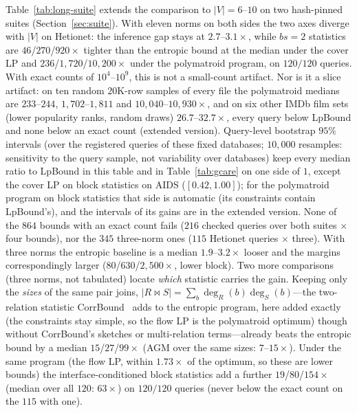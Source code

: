\documentclass[sigconf, nonacm, acmthm=false]{acmart}
\begin{document}
Table~\ref{tab:long-suite} extends the comparison to $|V|{=}6$--$10$ on two hash-pinned suites (Section~\ref{sec:suite}). With eleven norms on both sides the two axes
diverge with $|V|$ on Hetionet: the inference gap stays at
$2.7$--$3.1\times$, while $bs{=}2$ statistics are $46$/$270$/$920\times$
tighter than the entropic bound at the median under the cover LP and
$236$/$1{,}720$/$10{,}200\times$ under the polymatroid program, on
$120/120$ queries.
With exact counts of $10^{4}$--$10^{9}$, this is not a small-count artifact. Nor is it a slice artifact: on ten random $20$K-row samples of every file the polymatroid medians are $233$--$244$, $1{,}702$--$1{,}811$ and $10{,}040$--$10{,}930\times$, and on six other IMDb film sets (lower popularity ranks, random draws) $26.7$--$32.7\times$, every query below LpBound and none below an exact count (extended version). Query-level bootstrap $95\%$ intervals (over the registered queries of these fixed databases; $10{,}000$
resamples: sensitivity to the query sample, not variability over databases) keep every median ratio to LpBound in this table and in
Table~\ref{tab:gcare} on one side of $1$, except the cover LP on block
statistics on AIDS ($[0.42, 1.00]$); for the polymatroid program on block statistics that side is automatic (its constraints contain LpBound's), and the intervals of its gains are in the extended version. None of the $864$ bounds with an exact count
fails ($216$ checked queries over both suites ${\times}$ four bounds), nor
the $345$ three-norm ones ($115$ Hetionet queries ${\times}$ three). With
three norms the entropic baseline is a median $1.9$--$3.2\times$ looser
and the margins correspondingly larger ($80$/$630$/$2{,}500\times$, lower
block). Two more comparisons (three norms, not tabulated) locate \emph{which} statistic
carries the gain. Keeping only the \emph{sizes} of the same
pair joins, $|R\bowtie S| = \sum_b \deg_R(b)\deg_S(b)$---the
two-relation statistic CorrBound~\cite{mayer2026corrbound} adds to the
entropic program, here added exactly (the constraints stay simple, so the
flow LP is the polymatroid optimum) though without CorrBound's sketches
or multi-relation terms---already beats the entropic bound by a median
$15$/$27$/$99\times$ (AGM over the same sizes: $7$--$15\times$). Under
the same program (the flow LP, within $1.73\times$ of the optimum, so
these are lower bounds) the interface-conditioned block statistics add
a further $19$/$80$/$154\times$ (median over all $120$: $63\times$) on $120/120$ queries (never below the
exact count on the $115$ with one).
\end{document}
